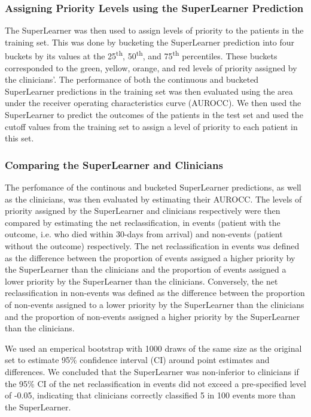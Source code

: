 \documentclass[10pt,letterpaper]{article}\usepackage[]{graphicx}\usepackage[]{color}
\begin{document}
\subsubsection*{Assigning Priority Levels using the SuperLearner Prediction}
The SuperLearner was then used to assign levels of priority to the patients in
the training set. This was done by bucketing the SuperLearner prediction into
four buckets by its values at the 25\textsuperscript{th},
50\textsuperscript{th}, and 75\textsuperscript{th} percentiles. These buckets
corresponded to the green, yellow, orange, and red levels of priority assigned
by the clinicians'. The performance of both the continuous and bucketed
SuperLearner predictions in the training set was then evaluated using the area
under the receiver operating characteristics curve (AUROCC). We then used the
SuperLearner to predict the outcomes of the patients in the test set and used
the cutoff values from the training set to assign a level of priority to each
patient in this set.

\subsubsection*{Comparing the SuperLearner and Clinicians}
The perfomance of the continous and bucketed SuperLearner predictions, as well
as the clinicians, was then evaluated by estimating their AUROCC. The levels of
priority assigned by the SuperLearner and clinicians respectively were then
compared by estimating the net reclassification, in events (patient with the
outcome, i.e. who died within 30-days from arrival) and non-events (patient
without the outcome) respectively. The net reclassification in events was
defined as the difference between the proportion of events assigned a higher
priority by the SuperLearner than the clinicians and the proportion of events
assigned a lower priority by the SuperLearner than the clinicians. Conversely,
the net reclassification in non-events was defined as the difference between the
proportion of non-events assigned to a lower priority by the SuperLearner than
the clinicians and the proportion of non-events assigned a higher priority by
the SuperLearner than the clinicians.

We used an emperical bootstrap with 1000 draws of the same size as the original
set to estimate 95\% confidence interval (CI) around point estimates and
differences. We concluded that the SuperLearner was non-inferior to clinicians
if the 95\% CI of the net reclassification in events did not exceed a
pre-specified level of -0.05, indicating that clinicians correctly classified 5
in 100 events more than the SuperLearner.
\end{document}
